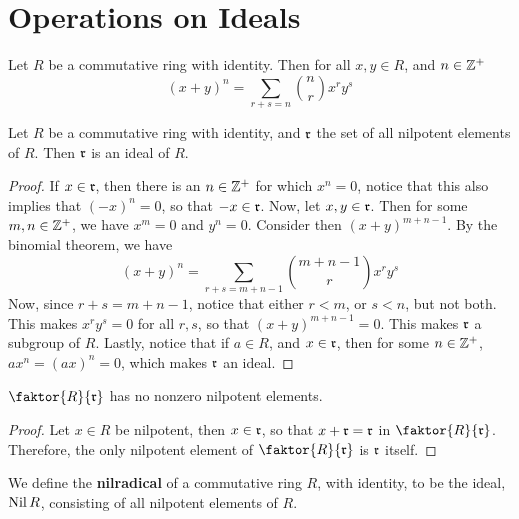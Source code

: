 \section{Operations on Ideals}
\label{section_5.5}

\begin{theorem}\label{5.5.1}
    Let $R$ be a commutative ring with identity. Then for all  $x,y \in R$, and
     $n \in \mathbb{Z}^+$
     \begin{equation*}
         (x+y)^n=\sum_{r+s=n}{{n \choose r}x^ry^s}
     \end{equation*}
\end{theorem}

\begin{lemma}\label{lemma_5.5.2}
    Let $R$ be a commutative ring with identity, and $\mathfrak{r}$ the set of all
    nilpotent elements of $R$. Then $\mathfrak{r}$ is an ideal of $R$.
\end{lemma}
\begin{proof}
    If $x \in \mathfrak{r}$, then there is an  $n \in \mathbb{Z}^+$ for which  $x^n=0$, notice
    that this also implies that  $(-x)^n=0$, so that $-x \in \mathfrak{r}$. Now, let $x,y
    \in \mathfrak{r}$. Then for some $m,n \in \mathbb{Z}^+$, we have $x^m=0$ and $y^n=0$.
    Consider then $(x+y)^{m+n-1}$. By the binomial theorem, we have
     \begin{equation*}
         (x+y)^n=\sum_{r+s=m+n-1}{{m+n-1 \choose r}x^ry^s}
     \end{equation*}
     Now, since $r+s=m+n-1$, notice that either  $r<m$, or  $s<n$, but not both.
     This makes  $x^ry^s=0$ for all  $r,s$, so that  $(x+y)^{m+n-1}=0$. This
     makes $\mathfrak{r}$ a subgroup of  $R$. Lastly, notice that if  $a \in R$, and  $x
     \in \mathfrak{r}$, then for some  $n \in \mathbb{Z}^+$,  $ax^n=(ax)^n=0$, which makes $\mathfrak{r}$
     an ideal.
\end{proof}
\begin{corollary}
    $\faktor{R}{\rf}$ has no nonzero nilpotent elements.
\end{corollary}
\begin{proof}
    Let $x \in R$ be nilpotent, then $x \in \mathfrak{r}$, so that $x+\mathfrak{r}=\mathfrak{r}$ in
    $\faktor{R}{\rf}$. Therefore, the only nilpotent element of
    $\faktor{R}{\rf}$ is $\mathfrak{r}$ itself.
\end{proof}

\begin{definition}
    We define the \textbf{nilradical} of a commutative ring $R$, with identity,
    to be the ideal, $\operatorname{Nil}{R}$, consisting of all nilpotent elements of $R$.
\end{definition}

